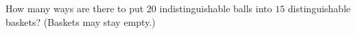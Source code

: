How many ways are there to put $20$ indistinguishable balls into $15$ distinguishable baskets? (Baskets may stay empty.)
